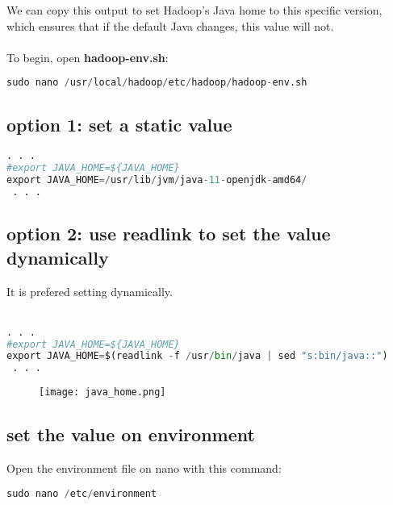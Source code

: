 \documentclass[onecolumn]{article}
\begin{document}
We can copy this output to set Hadoop’s Java home to this specific version, which ensures that if the default Java changes, this value will not.\\\\

To begin, open \textbf{hadoop-env.sh}:

\begin{lstlisting}[language=Python, caption= java path]
sudo nano /usr/local/hadoop/etc/hadoop/hadoop-env.sh
\end{lstlisting}

\subsection{option 1: set a static value}

\begin{lstlisting}[language=Python, caption= /usr/local/hadoop/etc/hadoop/hadoop-env.sh]
 . . .
#export JAVA_HOME=${JAVA_HOME}
export JAVA_HOME=/usr/lib/jvm/java-11-openjdk-amd64/
 . . . 
\end{lstlisting}

\subsection{option 2: use readlink to set the value dynamically}

It is prefered setting dynamically.\\\\

\begin{lstlisting}[language=Python, caption= /usr/local/hadoop/etc/hadoop/hadoop-env.sh]
 . . .
#export JAVA_HOME=${JAVA_HOME}
export JAVA_HOME=$(readlink -f /usr/bin/java | sed "s:bin/java::")
 . . . 
\end{lstlisting}

\begin{figure}[ht!]
\centering
\texttt{[image: java\_home.png]}
\caption{\label{}}
\end{figure}

\subsection{set the value on environment}

Open the environment file on nano with this command:

\begin{lstlisting}[language=Python, caption=  s]
sudo nano /etc/environment
\end{lstlisting}
\end{document}
